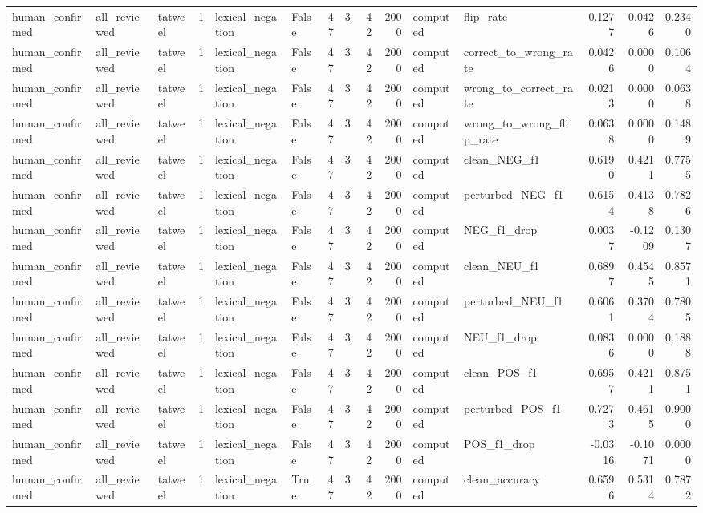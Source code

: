 \begin{tabular}{lllrllrrrrllrrr}
human_confirmed & all_reviewed & tatweel & 1 & lexical_negation & False & 47 & 3 & 42 & 2000 & computed & flip_rate & 0.1277 & 0.0426 & 0.2340 \\
human_confirmed & all_reviewed & tatweel & 1 & lexical_negation & False & 47 & 3 & 42 & 2000 & computed & correct_to_wrong_rate & 0.0426 & 0.0000 & 0.1064 \\
human_confirmed & all_reviewed & tatweel & 1 & lexical_negation & False & 47 & 3 & 42 & 2000 & computed & wrong_to_correct_rate & 0.0213 & 0.0000 & 0.0638 \\
human_confirmed & all_reviewed & tatweel & 1 & lexical_negation & False & 47 & 3 & 42 & 2000 & computed & wrong_to_wrong_flip_rate & 0.0638 & 0.0000 & 0.1489 \\
human_confirmed & all_reviewed & tatweel & 1 & lexical_negation & False & 47 & 3 & 42 & 2000 & computed & clean_NEG_f1 & 0.6190 & 0.4211 & 0.7755 \\
human_confirmed & all_reviewed & tatweel & 1 & lexical_negation & False & 47 & 3 & 42 & 2000 & computed & perturbed_NEG_f1 & 0.6154 & 0.4138 & 0.7826 \\
human_confirmed & all_reviewed & tatweel & 1 & lexical_negation & False & 47 & 3 & 42 & 2000 & computed & NEG_f1_drop & 0.0037 & -0.1209 & 0.1307 \\
human_confirmed & all_reviewed & tatweel & 1 & lexical_negation & False & 47 & 3 & 42 & 2000 & computed & clean_NEU_f1 & 0.6897 & 0.4545 & 0.8571 \\
human_confirmed & all_reviewed & tatweel & 1 & lexical_negation & False & 47 & 3 & 42 & 2000 & computed & perturbed_NEU_f1 & 0.6061 & 0.3704 & 0.7805 \\
human_confirmed & all_reviewed & tatweel & 1 & lexical_negation & False & 47 & 3 & 42 & 2000 & computed & NEU_f1_drop & 0.0836 & 0.0000 & 0.1888 \\
human_confirmed & all_reviewed & tatweel & 1 & lexical_negation & False & 47 & 3 & 42 & 2000 & computed & clean_POS_f1 & 0.6957 & 0.4211 & 0.8751 \\
human_confirmed & all_reviewed & tatweel & 1 & lexical_negation & False & 47 & 3 & 42 & 2000 & computed & perturbed_POS_f1 & 0.7273 & 0.4615 & 0.9000 \\
human_confirmed & all_reviewed & tatweel & 1 & lexical_negation & False & 47 & 3 & 42 & 2000 & computed & POS_f1_drop & -0.0316 & -0.1071 & 0.0000 \\
human_confirmed & all_reviewed & tatweel & 1 & lexical_negation & True & 47 & 3 & 42 & 2000 & computed & clean_accuracy & 0.6596 & 0.5314 & 0.7872 \\

\end{tabular}
